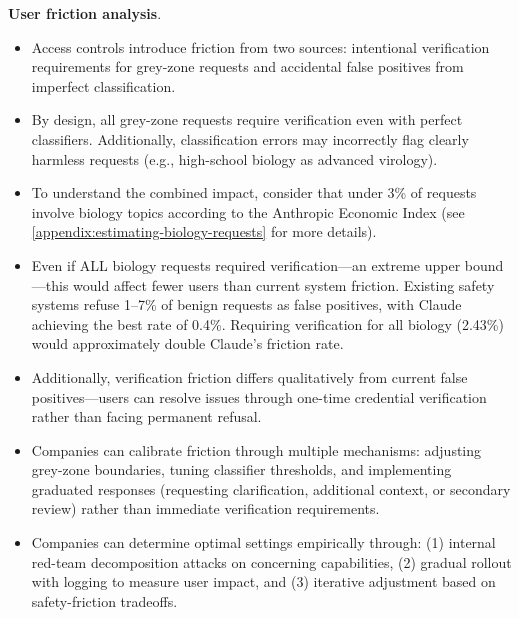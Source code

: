 \documentclass{article}
\theoremstyle{plain}
\theoremstyle{definition}
\theoremstyle{remark}
\begin{document}
\textbf{User friction analysis}.
\begin{itemize}
  \item Access controls introduce friction from two sources: intentional verification requirements for grey-zone requests and accidental false positives from imperfect classification.
  \item By design, all grey-zone requests require verification even with perfect classifiers. Additionally, classification errors may incorrectly flag clearly harmless requests (e.g., high-school biology as advanced virology).
  \item To understand the combined impact, consider that under 3\% of requests involve biology topics according to the Anthropic Economic Index \cite{handa2025economictasksperformedai} (see \cref{appendix:estimating-biology-requests} for more details).
  \item Even if ALL biology requests required verification—an extreme upper bound—this would affect fewer users than current system friction. Existing safety systems refuse 1--7\% of benign requests as false positives, with Claude achieving the best rate of 0.4\%. Requiring verification for all biology (2.43\%) would approximately double Claude's friction rate.
  \item Additionally, verification friction differs qualitatively from current false positives—users can resolve issues through one-time credential verification rather than facing permanent refusal.
  \item Companies can calibrate friction through multiple mechanisms: adjusting grey-zone boundaries, tuning classifier thresholds, and implementing graduated responses (requesting clarification, additional context, or secondary review) rather than immediate verification requirements.
  \item Companies can determine optimal settings empirically through: (1) internal red-team decomposition attacks on concerning capabilities, (2) gradual rollout with logging to measure user impact, and (3) iterative adjustment based on safety-friction tradeoffs.
\end{itemize}
\end{document}
